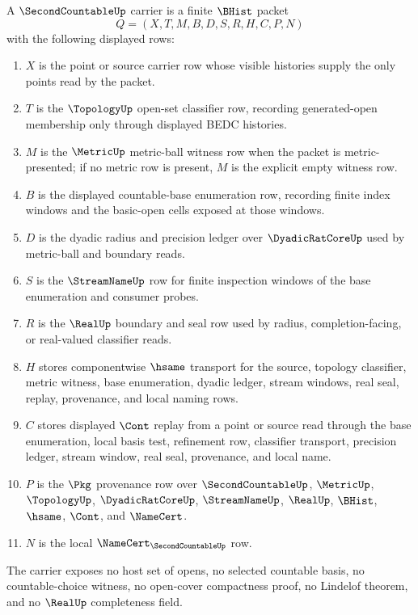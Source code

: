 \begin{definition}
\label{def:second-countable-carrier}
A $\SecondCountableUp$ carrier is a finite $\BHist$ packet
$$
Q=(X,T,M,B,D,S,R,H,C,P,N)
$$
with the following displayed rows:
\begin{enumerate}
\item $X$ is the point or source carrier row whose visible histories supply the only points read by the packet.
\item $T$ is the $\TopologyUp$ open-set classifier row, recording generated-open membership only through displayed BEDC histories.
\item $M$ is the $\MetricUp$ metric-ball witness row when the packet is metric-presented; if no metric row is present, $M$ is the explicit empty witness row.
\item $B$ is the displayed countable-base enumeration row, recording finite index windows and the basic-open cells exposed at those windows.
\item $D$ is the dyadic radius and precision ledger over $\DyadicRatCoreUp$ used by metric-ball and boundary reads.
\item $S$ is the $\StreamNameUp$ row for finite inspection windows of the base enumeration and consumer probes.
\item $R$ is the $\RealUp$ boundary and seal row used by radius, completion-facing, or real-valued classifier reads.
\item $H$ stores componentwise $\hsame$ transport for the source, topology classifier, metric witness, base enumeration, dyadic ledger, stream windows, real seal, replay, provenance, and local naming rows.
\item $C$ stores displayed $\Cont$ replay from a point or source read through the base enumeration, local basis test, refinement row, classifier transport, precision ledger, stream window, real seal, provenance, and local name.
\item $P$ is the $\Pkg$ provenance row over $\SecondCountableUp$, $\MetricUp$, $\TopologyUp$, $\DyadicRatCoreUp$, $\StreamNameUp$, $\RealUp$, $\BHist$, $\hsame$, $\Cont$, and $\NameCert$.
\item $N$ is the local $\NameCert_{\SecondCountableUp}$ row.
\end{enumerate}
The carrier exposes no host set of opens, no selected countable basis, no countable-choice witness, no open-cover compactness proof, no Lindelof theorem, and no $\RealUp$ completeness field.
\end{definition}

